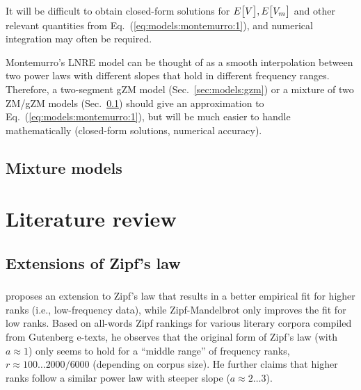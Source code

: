 \documentclass[a4paper]{article}
\begin{document}
It will be difficult to obtain closed-form solutions for $E_{}\bigl[V\bigr], E_{}\bigl[V_m\bigr]$ and other relevant quantities from Eq.~(\ref{eq:models:montemurro:1}), and numerical integration may often be required.

Montemurro's LNRE model can be thought of as a smooth interpolation between two power laws with different slopes that hold in different frequency ranges.  Therefore, a two-segment gZM model (Sec.~\ref{sec:models:gzm}) or a mixture of two ZM/gZM models (Sec.~\ref{sec:models:mixtures}) should give an approximation to Eq.~(\ref{eq:models:montemurro:1}), but will be much easier to handle mathematically (closed-form solutions, numerical accuracy).


\subsection{Mixture models}
\label{sec:models:mixtures}



\section{Literature review}
\label{sec:literature}

\subsection{Extensions of Zipf's law}
\label{sec:lit:extensions}

\subsubsection{\cite{Montemurro:01}}
\label{sec:lit:ext:Montemurro2001}

\citet{Montemurro:01} proposes an extension to Zipf's law that results in a better empirical fit for higher ranks (i.e., low-frequency data), while Zipf-Mandelbrot only improves the fit for low ranks.  Based on all-words Zipf rankings for various literary corpora compiled from Gutenberg e-texts, he observes that the original form of Zipf's law (with $a\approx 1$) only seems to hold for a ``middle range'' of frequency ranks, $r\approx 100 \ldots 2000 / 6000$ (depending on corpus size).  He further claims that higher ranks follow a similar power law with steeper slope ($a \approx 2 \ldots 3$).
\end{document}
